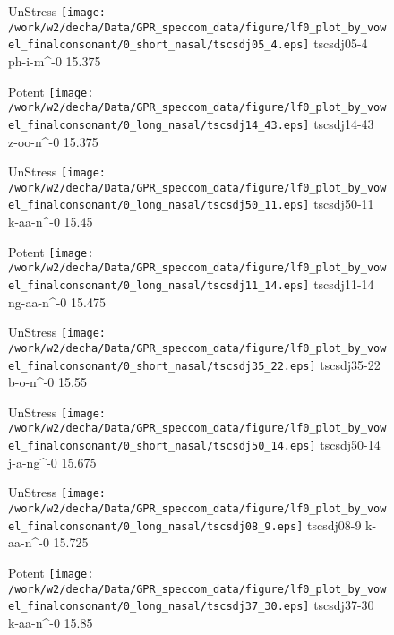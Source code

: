 \documentclass{article}
\begin{document}
\begin{figure}[t]
\begin{minipage}[b]{.24\textwidth}
UnStress
\centering
\texttt{[image: /work/w2/decha/Data/GPR\_speccom\_data/figure/lf0\_plot\_by\_vowel\_finalconsonant/0\_short\_nasal/tscsdj05\_4.eps]}
tscsdj05-4 ph-i-m\textasciicircum-0 15.375
\end{minipage}
\begin{minipage}[b]{.24\textwidth}
\colorbox{Apricot}{Potent}
\centering
\texttt{[image: /work/w2/decha/Data/GPR\_speccom\_data/figure/lf0\_plot\_by\_vowel\_finalconsonant/0\_long\_nasal/tscsdj14\_43.eps]}
tscsdj14-43 z-oo-n\textasciicircum-0 15.375
\end{minipage}
\begin{minipage}[b]{.24\textwidth}
UnStress
\centering
\texttt{[image: /work/w2/decha/Data/GPR\_speccom\_data/figure/lf0\_plot\_by\_vowel\_finalconsonant/0\_long\_nasal/tscsdj50\_11.eps]}
tscsdj50-11 k-aa-n\textasciicircum-0 15.45
\end{minipage}
\begin{minipage}[b]{.24\textwidth}
\colorbox{Apricot}{Potent}
\centering
\texttt{[image: /work/w2/decha/Data/GPR\_speccom\_data/figure/lf0\_plot\_by\_vowel\_finalconsonant/0\_long\_nasal/tscsdj11\_14.eps]}
tscsdj11-14 ng-aa-n\textasciicircum-0 15.475
\end{minipage}
\end{figure}
\clearpage
\begin{figure}[t]
\begin{minipage}[b]{.24\textwidth}
UnStress
\centering
\texttt{[image: /work/w2/decha/Data/GPR\_speccom\_data/figure/lf0\_plot\_by\_vowel\_finalconsonant/0\_short\_nasal/tscsdj35\_22.eps]}
tscsdj35-22 b-o-n\textasciicircum-0 15.55
\end{minipage}
\begin{minipage}[b]{.24\textwidth}
UnStress
\centering
\texttt{[image: /work/w2/decha/Data/GPR\_speccom\_data/figure/lf0\_plot\_by\_vowel\_finalconsonant/0\_short\_nasal/tscsdj50\_14.eps]}
tscsdj50-14 j-a-ng\textasciicircum-0 15.675
\end{minipage}
\begin{minipage}[b]{.24\textwidth}
UnStress
\centering
\texttt{[image: /work/w2/decha/Data/GPR\_speccom\_data/figure/lf0\_plot\_by\_vowel\_finalconsonant/0\_long\_nasal/tscsdj08\_9.eps]}
tscsdj08-9 k-aa-n\textasciicircum-0 15.725
\end{minipage}
\begin{minipage}[b]{.24\textwidth}
\colorbox{Apricot}{Potent}
\centering
\texttt{[image: /work/w2/decha/Data/GPR\_speccom\_data/figure/lf0\_plot\_by\_vowel\_finalconsonant/0\_long\_nasal/tscsdj37\_30.eps]}
tscsdj37-30 k-aa-n\textasciicircum-0 15.85
\end{minipage}
\end{figure}
\end{document}
